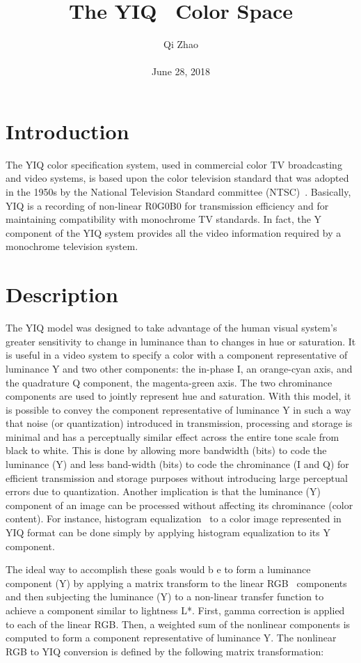 \documentclass[10pt,twocolumn,letterpaper]{article}
\begin{document}
\title{The YIQ~\cite{Ahirwal2008FPGA} Color Space}
\author{Qi Zhao\\\\June 28, 2018}

\maketitle
\section{Introduction}
The YIQ color specification system, used in commercial color TV broadcasting and video systems, is based upon the color television standard that was adopted in the 1950s by the National Television Standard committee (NTSC)~\cite{Smith2002A}. Basically, YIQ is a recording of non-linear R0G0B0 for transmission efficiency and for maintaining compatibility with monochrome TV standards. In fact, the Y component of the YIQ system provides all the video information required by a monochrome television system.

\section{Description}
The YIQ model was designed to take advantage of the human visual system's greater sensitivity to change in luminance than to changes in hue or saturation. It is useful in a video system to specify a color with a component representative of luminance Y and two other components: the in-phase I, an orange-cyan axis, and the quadrature Q component, the magenta-green axis. The two chrominance components are used to jointly represent hue and saturation. With this model, it is possible to convey the component representative of luminance Y in such a way that noise (or quantization) introduced in transmission, processing and storage is minimal and has a perceptually similar effect across the entire tone scale from black to white. This is done by allowing more bandwidth (bits) to code the luminance (Y) and less band-width (bits) to code the chrominance (I and Q) for efficient transmission and storage purposes without introducing large perceptual errors due to quantization. Another implication is that the luminance (Y) component of an image can be processed without affecting its chrominance (color content). For instance, histogram equalization~\cite{Pizer1987Adaptive} to a color image represented in YIQ format can be done simply by applying histogram equalization to its Y component.
\par The ideal way to accomplish these goals would b e to form a luminance component (Y) by applying a matrix transform to the linear RGB~\cite{Finlayson2002Optimization} components and then subjecting the luminance (Y) to a non-linear transfer function to achieve a component similar to lightness L*.  First, gamma correction is applied to each of the linear RGB. Then, a weighted sum of the nonlinear components is computed to form a component representative of luminance Y. The nonlinear RGB to YIQ conversion is defined by the following matrix transformation:
\end{document}
